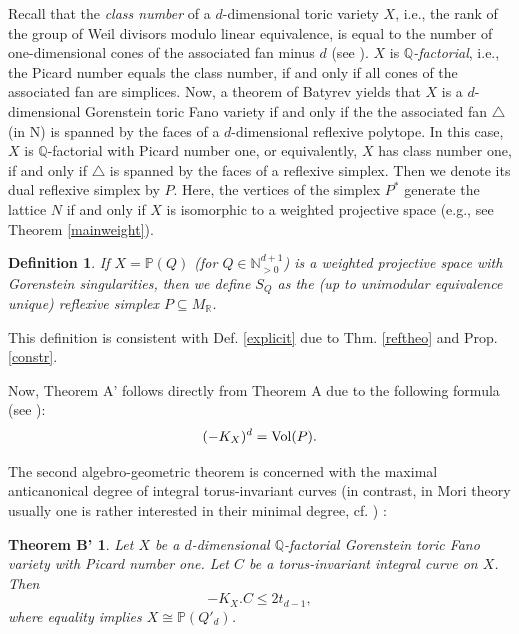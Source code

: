 \documentclass[a4paper,twoside]{article}
\def\N{{\mathbb N}}
\def\weights{\N_{>0}^{d+1}}
\def\P{{\mathbb P}}
\def\Q{{\mathbb Q}}
\def\R{{\mathbb R}}
\def\vol{{\rm Vol}}
\def\MR{{M_{\R}}}
\def\fan{\triangle}
\def\KX{{K_X}}
\newtheorem*{theoremBs*}{Theorem B'}
\newtheorem{definition}[theorem]{Definition}
\begin{document}
\smallskip

Recall that the {\em class number} of a $d$-dimensional toric variety $X$, i.e., the rank of the group of Weil divisors modulo
linear equivalence, is equal to the number of one-dimensional cones of the associated fan minus $d$ (see \cite[p. 63]{Ful93}). $X$ is {\em $\Q$-factorial}, i.e., 
the Picard number equals the class number, if and only if all cones of the associated fan are simplices. Now, a theorem of Batyrev \cite[Thm.4.1.9]{Bat94} yields that  
$X$ is a $d$-dimensional Gorenstein toric Fano variety if and only if the the associated fan $\fan$ 
(in N) is spanned by the faces of a $d$-dimensional reflexive polytope. 
In this case, $X$ is $\Q$-factorial with Picard number one, or equivalently, $X$ has class number one, if and only if $\fan$ is spanned by the faces of a 
reflexive simplex. Then we denote its dual reflexive simplex by $P$. Here, the vertices of the simplex $P^*$ generate the lattice $N$ if 
and only if $X$ is isomorphic to a weighted projective space (e.g., see Theorem \ref{mainweight}). 

\begin{definition}{\rm 
If $X = \P(Q)$ (for $Q \in \weights$) is a weighted projective space with Gorenstein singularities, then we 
define $S_Q$ as the (up to unimodular equivalence unique) reflexive simplex $P \subseteq \MR$. 
\label{deffy}}
\end{definition}

This definition is consistent with Def. \ref{explicit} due to Thm. \ref{reftheo} and Prop. \ref{constr}. 

\smallskip

Now, Theorem A' follows directly from Theorem A due to the following formula (see \cite[p.111]{Ful93}):
\begin{equation}
(-\KX)^d = \vol(P).
\label{volf}
\end{equation}

\smallskip

The second algebro-geometric theorem is concerned with the maximal anticanonical degree of integral torus-invariant curves 
(in contrast, in Mori theory usually one is rather interested in their minimal degree, cf. \cite[Prop.2.1]{Lat96}) :

\begin{theoremBs*}
Let $X$ be a $d$-dimensional $\Q$-factorial Gorenstein toric Fano variety with Picard number one. 
Let $C$ be a torus-invariant integral curve on $X$. Then 
\[-\KX.C \leq 2 t_{d-1},\]
where equality implies $X \cong \P(Q'_d)$.
\label{theB}
\end{theoremBs*}
\end{document}
